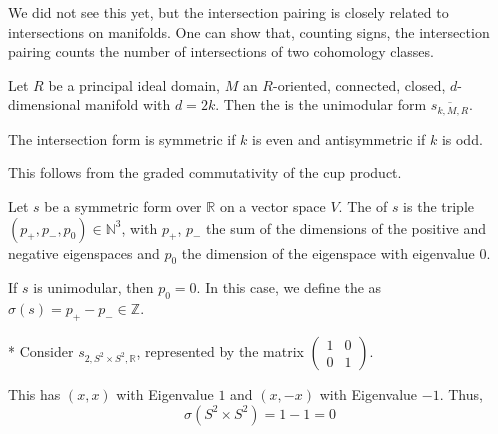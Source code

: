 

\begin{oral}
  We did not see this yet, but the intersection pairing
  is closely related to intersections on manifolds.
  One can show that, counting signs, the intersection pairing
  counts the number of intersections of two
  cohomology classes.
\end{oral}

\begin{definition}
  \label{def:unimodular-form-on-manifold-of-even-dimension}
  Let $R$ be a principal ideal domain,
  $M$ an $R$-oriented, connected, closed,
  $d$-dimensional manifold with $d=2k$.
  Then the  is the unimodular form
  $\overline{s_{k,M,R}}$.
\end{definition}

\begin{remark}
  The intersection form is symmetric if $k$ is even
  and antisymmetric if $k$ is odd.

  This follows from the graded commutativity of the cup product.
\end{remark}


\begin{definition}
  \label{def:signature-of-form}
  Let $s$ be a symmetric form over $\mathbb{R}$
  on a vector space $V$.
  The  of $s$ is the triple
  $(p_{+}, p_{-}, p_0) \in \mathbb{N}^3$,
  with $p_{+}$, $p_{-}$ the sum of the dimensions of the
  positive and negative eigenspaces and $p_0$ the dimension
  of the eigenspace with eigenvalue $0$.

  If $s$ is unimodular, then $p_0=0$.
  In this case, we define the   as
  $σ(s) = p_{+} - p_{-} \in \mathbb{Z}$.
\end{definition}

\begin{example}*
  Consider $s_{2, S^2 \times S^2, \mathbb{R}}$,
  represented by the matrix
  $\begin{pmatrix} 1 & 0 \\ 0 & 1 \end{pmatrix} $.

  This has $(x,x)$ with Eigenvalue $1$
  and $(x,-x)$ with Eigenvalue $-1$.
  Thus,
  \[
    σ(S^2\times S^2) = 1 - 1 = 0
  \] 
\end{example}

